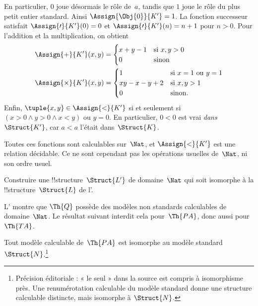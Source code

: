 \documentclass[../../../include/open-logic-section]{subfiles}
\begin{document}
\begin{ex}
En particulier, $0$ joue désormais
le rôle de~$a$, tandis que $1$ joue
le rôle du plus petit entier standard.
Ainsi $\Assign{\Obj{0}}{K'}=1$.
La fonction successeur satisfait
$\Assign{\prime}{K'}(0)=0$
et $\Assign{\prime}{K'}(n)=n+1$
pour $n>0$. Pour l'addition et
la multiplication, on obtient
\begin{align*}
\Assign{+}{K'}(x,y) & =
  \begin{cases}
    x+y-1 & \text{si $x,y>0$}\\
    0 & \text{sinon}
  \end{cases}\\
\Assign{\times}{K'}(x,y) & =
  \begin{cases}
    1 & \text{si $x=1$ ou $y=1$}\\
    xy-x-y+2 & \text{si $x,y>1$}\\
    0 & \text{sinon}.
  \end{cases}
\end{align*}
Enfin,
$\tuple{x,y}\in\Assign{<}{K'}$
si et seulement si
$(x>0\land y>0\land x<y)$
ou $y=0$. En particulier, $0<0$
est vrai \emph{dans}~$\Struct{K'}$,
car $a<a$ l'était dans~$\Struct{K}$.

Toutes ces fonctions sont calculables
sur~$\Nat$, et $\Assign{<}{K'}$
est une relation décidable. Ce ne
sont cependant pas les opérations
usuelles de~$\Nat$, ni son ordre usuel.
\end{ex}

\begin{prob}
Construire une !!{structure}~$\Struct{L'}$
de domaine~$\Nat$ qui soit isomorphe
à la !!{structure}~$\Struct{L}$ de
l'.
\end{prob}

\begin{explain}
L' montre que
$\Th{Q}$ possède des modèles non standards
calculables de domaine~$\Nat$.
Le résultat suivant interdit cela
pour~$\Th{PA}$, donc aussi
pour~$\Th{TA}$.
\end{explain}

\begin{thm}
Tout modèle calculable de~$\Th{PA}$
est isomorphe au modèle standard
$\Struct{N}$.\footnote{Précision éditoriale : « le seul » dans la source est compris à isomorphisme près. Une renumérotation calculable du modèle standard donne une structure calculable distincte, mais isomorphe à $\Struct{N}$.}
\end{thm}
\end{document}
